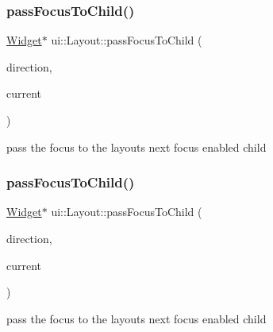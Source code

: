 \subsubsection{\texorpdfstring{pass\+Focus\+To\+Child()}{passFocusToChild()}\hspace{0.1cm}{\footnotesize\ttfamily [1/2]}}
{\footnotesize\ttfamily \hyperlink{classui_1_1Widget}{Widget}$\ast$ ui\+::\+Layout\+::pass\+Focus\+To\+Child (\begin{DoxyParamCaption}\item[{\hyperlink{classui_1_1Widget_a8ae8e8fc793a04a87584205cd1e8a8a5}{Focus\+Direction}}]{direction,  }\item[{\hyperlink{classui_1_1Widget}{Widget} $\ast$}]{current }\end{DoxyParamCaption})\hspace{0.3cm}{\ttfamily [protected]}}

pass the focus to the layout\textquotesingle{}s next focus enabled child \mbox{\label{classui_1_1Layout_ade484ea5501c2866bf72bd35d6aa14ff}} 
\subsubsection{\texorpdfstring{pass\+Focus\+To\+Child()}{passFocusToChild()}\hspace{0.1cm}{\footnotesize\ttfamily [2/2]}}
{\footnotesize\ttfamily \hyperlink{classui_1_1Widget}{Widget}$\ast$ ui\+::\+Layout\+::pass\+Focus\+To\+Child (\begin{DoxyParamCaption}\item[{\hyperlink{classui_1_1Widget_a8ae8e8fc793a04a87584205cd1e8a8a5}{Focus\+Direction}}]{direction,  }\item[{\hyperlink{classui_1_1Widget}{Widget} $\ast$}]{current }\end{DoxyParamCaption})\hspace{0.3cm}{\ttfamily [protected]}}

pass the focus to the layout\textquotesingle{}s next focus enabled child \mbox{\label{classui_1_1Layout_a6b40fa4ad7a14a1eece297e466e2c86e}} 
